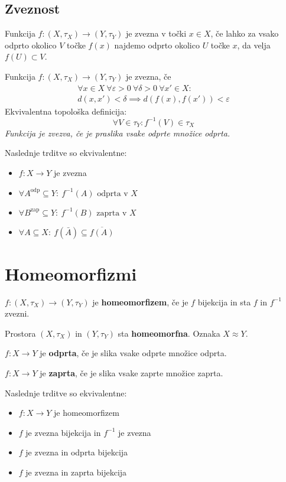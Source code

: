 \subsection*{Zveznost}
Funkcija $f: (X, \tau_X) \to (Y, \tau_Y)$ je zvezna v točki $x \in X$, če lahko za vsako odprto okolico $V$ točke $f(x)$ najdemo odprto okolico $U$ točke $x$, da velja $f(U) \subset V$.

Funkcija $f: (X, \tau_X) \to (Y, \tau_Y)$ je zvezna, če
\begin{multline*}
	\forall x \in X\ \forall \varepsilon > 0\ \forall \delta > 0\ \forall x' \in X:\\ d(x,x') < \delta \implies d(f(x),f(x')) < \varepsilon
\end{multline*}
Ekvivalentna topološka definicija:
\[\forall V \in \tau_Y : f^{-1}(V) \in \tau_X\]
\emph{Funkcija je zvezva, če je praslika vsake odprte množice odprta.}

Naslednje trditve so ekvivalentne:
\begin{itemize}
	\item $f: X \to Y$ je zvezna
	\item $\forall A^{\text{odp}} \subseteq Y:\ f^{-1}(A) \text{ odprta v }X$
	\item $\forall B^{\text{zap}} \subseteq Y:\ f^{-1}(B) \text{ zaprta v }X$
	\item $\forall A \subseteq X:\ f(\bar{A}) \subseteq \overline{f(A)}$
\end{itemize}

\section*{Homeomorfizmi}
$f: (X, \tau_X) \to (Y, \tau_Y)$ je \textbf{homeomorfizem}, če je $f$ bijekcija in sta $f$ in $f^{-1}$ zvezni.

Prostora $(X, \tau_X)$ in $(Y, \tau_Y)$ sta \textbf{homeomorfna}. Oznaka $X \approx Y$.

$f: X \to Y$ je \textbf{odprta}, če je slika vsake odprte množice odprta. 

$f: X \to Y$ je \textbf{zaprta}, če je slika vsake zaprte množice zaprta. 

Naslednje trditve so ekvivalentne:
\begin{itemize}
	\item $f: X \to Y$ je homeomorfizem
	\item $f$ je zvezna bijekcija in $f^{-1}$ je zvezna
	\item $f$ je zvezna in odprta bijekcija
	\item $f$ je zvezna in zaprta bijekcija
\end{itemize}

